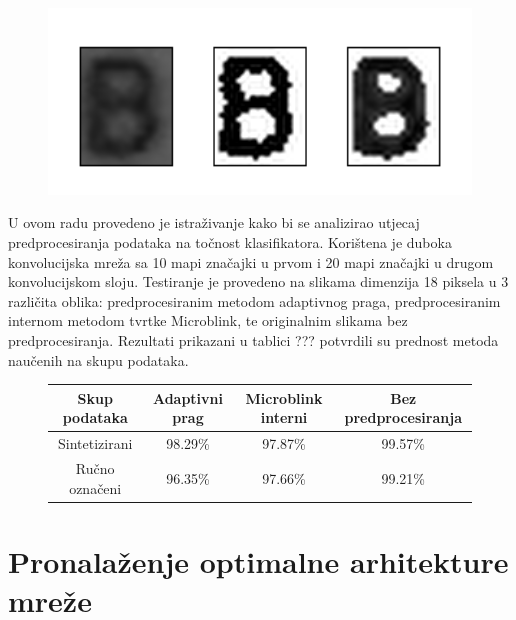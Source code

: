 \documentclass[lmodern, utf8, diplomski, numeric]{fer}
\begin{document}
\begin{figure}[ht!]
\centering
\includegraphics[width=13cm]{slike/preprocessing_comparison.png}
\caption{}
\end{figure}

U ovom radu provedeno je istraživanje kako bi se analizirao utjecaj predprocesiranja podataka na točnost klasifikatora. Korištena je duboka konvolucijska mreža sa 10 mapi značajki u prvom i 20 mapi značajki u drugom konvolucijskom sloju. Testiranje je provedeno na slikama dimenzija 18 piksela u 3 različita oblika: predprocesiranim metodom adaptivnog praga, predprocesiranim internom metodom tvrtke Microblink, te originalnim slikama bez predprocesiranja. Rezultati prikazani u tablici ??? potvrdili su prednost metoda naučenih na skupu podataka.    


\begin{figure}[ht!]
\begin{center}
\centering


    \begin{tabular}{ | c| c| c|c |}
    \hline
    Skup podataka & Adaptivni prag & Microblink interni & Bez predprocesiranja \\ \hline
    Sintetizirani & 98.29\% & 97.87\%  & 99.57\% \\ \hline
    Ručno označeni & 96.35\% & 97.66\% & 99.21\% \\ \hline

    \hline
    \end{tabular}
\end{center}
\caption{}
\end{figure}



\section{Pronalaženje optimalne arhitekture mreže}
\end{document}
